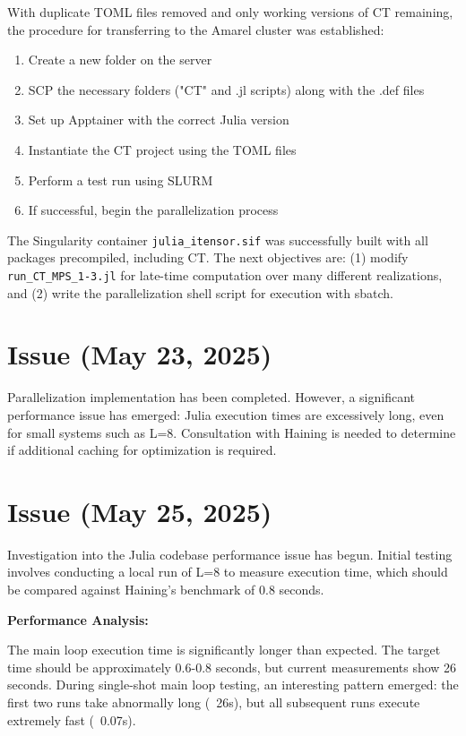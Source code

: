 \documentclass[11pt,a4paper]{article}
\begin{document}
With duplicate TOML files removed and only working versions of CT remaining, the procedure for transferring to the Amarel cluster was established:
\begin{enumerate}
    \item Create a new folder on the server
    \item SCP the necessary folders ("CT" and .jl scripts) along with the .def files
    \item Set up Apptainer with the correct Julia version
    \item Instantiate the CT project using the TOML files
    \item Perform a test run using SLURM
    \item If successful, begin the parallelization process
\end{enumerate}

The Singularity container \texttt{julia\_itensor.sif} was successfully built with all packages precompiled, including CT. The next objectives are: (1) modify \texttt{run\_CT\_MPS\_1-3.jl} for late-time computation over many different realizations, and (2) write the parallelization shell script for execution with sbatch.

\section{Issue (May 23, 2025)}

Parallelization implementation has been completed. However, a significant performance issue has emerged: Julia execution times are excessively long, even for small systems such as L=8. Consultation with Haining is needed to determine if additional caching for optimization is required.

\section{Issue (May 25, 2025)}

Investigation into the Julia codebase performance issue has begun. Initial testing involves conducting a local run of L=8 to measure execution time, which should be compared against Haining's benchmark of 0.8 seconds.

\textbf{Performance Analysis:}

The main loop execution time is significantly longer than expected. The target time should be approximately 0.6-0.8 seconds, but current measurements show 26 seconds. During single-shot main loop testing, an interesting pattern emerged: the first two runs take abnormally long (~26s), but all subsequent runs execute extremely fast (~0.07s).
\end{document}
